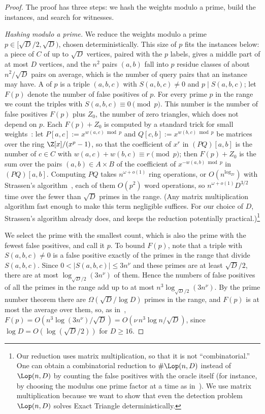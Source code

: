 \begin{proof}
The proof has three steps: we hash the weights modulo a prime, build the instances, and search for witnesses.

\emph{Hashing modulo a prime.} We reduce the weights modulo a prime $p\in[\sqrt D/2,\sqrt D)$, chosen deterministically. This size of $p$ fits the instances below: a piece of $C$ of up to $\sqrt D$ vertices, paired with the $p$ labels, gives a middle part of at most $D$ vertices, and the $n^2$ pairs $(a,b)$ fall into $p$ residue classes of about $n^2/\sqrt D$ pairs on average, which is the number of query pairs that an instance may have. A  of $p$ is a triple $(a,b,c)$ with $S(a,b,c)\ne0$ and $p\mid S(a,b,c)$; let $F(p)$ denote the number of false positives of $p$. For every prime $p$ in the range we count the triples with $S(a,b,c)\equiv0\pmod p$. This number is the number of false positives $F(p)$ plus $Z_0$, the number of zero triangles, which does not depend on $p$. Each $F(p)+Z_0$ is computed by a standard trick for small weights~\cite{AGM97,Zwi02}: let $P[a,c]:=x^{w(a,c)\bmod p}$ and $Q[c,b]:=x^{w(b,c)\bmod p}$ be matrices over the ring $\Z[x]/(x^p-1)$, so that the coefficient of $x^r$ in $(PQ)[a,b]$ is the number of $c\in C$ with $w(a,c)+w(b,c)\equiv r\pmod p$; then $F(p)+Z_0$ is the sum over the pairs $(a,b)\in A\times B$ of the coefficient of $x^{-w(a,b)\bmod p}$ in $(PQ)[a,b]$. Computing $PQ$ takes $n^{\omega+o(1)}$ ring operations, or $O(n^{\log_27})$ with Strassen's algorithm~\cite{Str69}, each of them $O(p^2)$ word operations, so $n^{\omega+o(1)}D^{3/2}$ time over the fewer than $\sqrt D$ primes in the range. (Any matrix multiplication algorithm fast enough to make this term negligible suffices. For our choice of $D$, Strassen's algorithm already does, and keeps the reduction potentially practical.)\footnote{Our reduction uses matrix multiplication, so that it is not ``combinatorial.'' One can obtain a combinatorial reduction to $\#\Lop(n,D)$ instead of $\Lop(n,D)$ by counting the false positives with the oracle itself (for instance, by choosing the modulus one prime factor at a time as in~\cite[Lemma~3.2]{FKP24}). We use matrix multiplication because we want to show that even the detection problem $\Lop(n,D)$ solves Exact Triangle deterministically.}

We select the prime with the smallest count, which is also the prime with the fewest false positives, and call it $p$. To bound $F(p)$, note that a triple with $S(a,b,c)\ne0$ is a false positive exactly of the primes in the range that divide $S(a,b,c)$. Since $0<|S(a,b,c)|\le3n^\nu$ and these primes are at least $\sqrt D/2$, there are at most $\log_{\sqrt D/2}(3n^\nu)$ of them. Hence the numbers of false positives of all the primes in the range add up to at most $n^3\log_{\sqrt D/2}(3n^\nu)$. %
By the prime number theorem there are $\Omega(\sqrt D/\log D)$ primes in the range, and $F(p)$ is at most the average over them, so, as in~\cite[Lemma~3.2]{FKP24}, $F(p)=O(n^3\log(3n^\nu)/\sqrt D)=O(\nu\,n^3\log n/\sqrt D)$, since $\log D=O(\log(\sqrt D/2))$ for $D\ge16$.


\end{proof}
